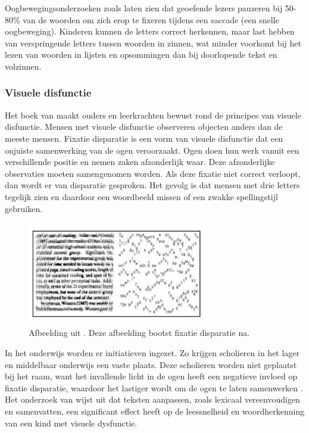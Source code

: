 Oogbewegingsonderzoeken zoals \textcite{RiveroContreras2021, Zhang2021} laten zien dat geoefende lezers pauzeren bij 50-80\% van de woorden om zich erop te fixeren tijdens een saccade (een snelle oogbeweging). Kinderen kunnen de letters correct herkennen, maar last hebben van verspringende letters tussen woorden in zinnen, wat minder voorkomt bij het lezen van woorden in lijsten en opsommingen dan bij doorlopende tekst en volzinnen.

\subsubsection{Visuele disfunctie}

Het boek van \textcite{Bezem2016} maakt ouders en leerkrachten bewust rond de principes van visuele disfunctie. Mensen met visuele disfunctie observeren objecten anders dan de meeste mensen. Fixatie disparatie is een vorm van visuele disfunctie dat een onjuiste samenwerking van de ogen veroorzaakt. Ogen doen hun werk vanuit een verschillende positie en nemen zaken afzonderlijk waar. Deze afzonderlijke observaties moeten samengenomen worden. Als deze fixatie niet correct verloopt, dan wordt er van disparatie gesproken. Het gevolg is dat mensen met drie letters tegelijk zien en daardoor een woordbeeld missen of een zwakke spellingstijl gebruiken.

\begin{figure}[H]
	\begin{center}
		\includegraphics[width=8cm]{img/visuele-disfunctie.png}
	\end{center}
	\caption{Afbeelding uit \textcite{Bezem2016}. Deze afbeelding bootst fixatie disparatie na.}
\end{figure}

In het onderwijs worden er initiatieven ingezet. Zo krijgen scholieren in het lager en middelbaar onderwijs een vaste plaats. Deze scholieren worden niet geplaatst bij het raam, want het invallende licht in de ogen heeft een negatieve invloed op fixatie disparatie, waardoor het lastiger wordt om de ogen te laten samenwerken \autocite{Bezem2016}. Het onderzoek van \textcite{RiveroContreras2021} wijst uit dat teksten aanpassen, zoals lexicaal vereenvoudigen en samenvatten, een significant effect heeft op de leessnelheid en woordherkenning van een kind met visuele dysfunctie.

